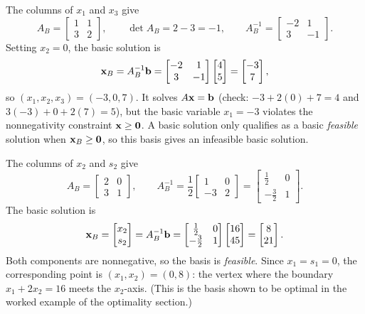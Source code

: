 
The columns of $x_1$ and $x_3$ give
\[
A_B =
\begin{bmatrix}
1 & 1 \\
3 & 2
\end{bmatrix},
\qquad
\det A_B = 2 - 3 = -1,
\qquad
A_B^{-1} =
\begin{bmatrix}
-2 & 1 \\
3 & -1
\end{bmatrix}.
\]
Setting $x_2 = 0$, the basic solution is
\[
\mathbf{x}_B = A_B^{-1}\mathbf{b} =
\begin{bmatrix}
-2 & 1 \\
3 & -1
\end{bmatrix}
\begin{bmatrix}
4 \\ 5
\end{bmatrix}
=
\begin{bmatrix}
-3 \\ 7
\end{bmatrix},
\]
so $(x_1, x_2, x_3) = (-3, 0, 7)$. It solves $A\mathbf{x} = \mathbf{b}$ (check:
$-3 + 2(0) + 7 = 4$ and $3(-3) + 0 + 2(7) = 5$), but the basic variable
$x_1 = -3$ violates the nonnegativity constraint $\mathbf{x} \geq \mathbf{0}$. A basic
solution only qualifies as a basic \emph{feasible} solution when
$\mathbf{x}_B \geq \mathbf{0}$, so this basis gives an infeasible basic solution.


The columns of $x_2$ and $s_2$ give
\[
A_B =
\begin{bmatrix}
2 & 0 \\
3 & 1
\end{bmatrix},
\qquad
A_B^{-1} = \frac{1}{2}
\begin{bmatrix}
1 & 0 \\
-3 & 2
\end{bmatrix}
=
\begin{bmatrix}
\tfrac12 & 0 \\
-\tfrac32 & 1
\end{bmatrix}.
\]
The basic solution is
\[
\mathbf{x}_B =
\begin{bmatrix} x_2 \\ s_2 \end{bmatrix}
= A_B^{-1}\mathbf{b} =
\begin{bmatrix}
\tfrac12 & 0 \\
-\tfrac32 & 1
\end{bmatrix}
\begin{bmatrix}
16 \\ 45
\end{bmatrix}
=
\begin{bmatrix}
8 \\ 21
\end{bmatrix}.
\]
Both components are nonnegative, so the basis is \emph{feasible}. Since
$x_1 = s_1 = 0$, the corresponding point is $(x_1, x_2) = (0, 8)$: the
vertex where the boundary $x_1 + 2x_2 = 16$ meets the $x_2$-axis. (This
is the basis shown to be optimal in the worked example of the optimality
section.)


